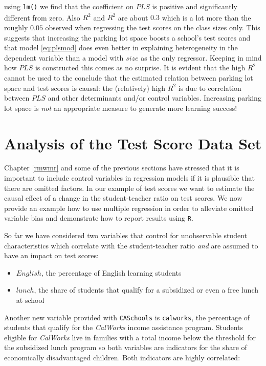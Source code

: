 \documentclass[]{book}
\theoremstyle{definition}
\theoremstyle{definition}
\theoremstyle{definition}
\theoremstyle{remark}
\begin{document}
using \texttt{lm()} we find that the coefficient on \(PLS\) is positive
and significantly different from zero. Also \(R^2\) and
\(\overline{R^2}\) are about \(0.3\) which is a lot more than the
roughly \(0.05\) observed when regressing the test scores on the class
sizes only. This suggests that increasing the parking lot space boosts a
school's test scores and that model \eqref{eq:plsmod} does even better in
explaining heterogeneity in the dependent variable than a model with
\(size\) as the only regressor. Keeping in mind how \(PLS\) is
constructed this comes as no surprise. It is evident that the high
\(R^2\) cannot be used to the conclude that the estimated relation
between parking lot space and test scores is causal: the (relatively)
high \(R^2\) is due to correlation between \(PLS\) and other
determinants and/or control variables. Increasing parking lot space is
\emph{not} an appropriate measure to generate more learning success!

\section{Analysis of the Test Score Data
Set}\label{analysis-of-the-test-score-data-set}

Chapter \ref{rmwmr} and some of the previous sections have stressed that
it is important to include control variables in regression models if it
is plausible that there are omitted factors. In our example of test
scores we want to estimate the causal effect of a change in the
student-teacher ratio on test scores. We now provide an example how to
use multiple regression in order to alleviate omitted variable bias and
demonstrate how to report results using \texttt{R}.

So far we have considered two variables that control for unobservable
student characteristics which correlate with the student-teacher ratio
\emph{and} are assumed to have an impact on test scores:

\begin{itemize}
\item
  \(English\), the percentage of English learning students
\item
  \(lunch\), the share of students that qualify for a subsidized or even
  a free lunch at school
\end{itemize}

Another new variable provided with \texttt{CASchools} is
\texttt{calworks}, the percentage of students that qualify for the
\emph{CalWorks} income assistance program. Students eligible for
\emph{CalWorks} live in families with a total income below the threshold
for the subsidized lunch program so both variables are indicators for
the share of economically disadvantaged children. Both indicators are
highly correlated:
\end{document}
